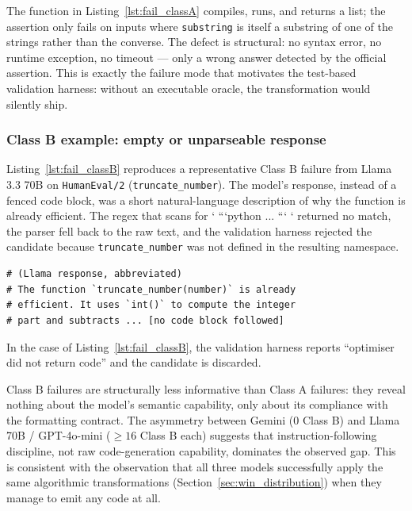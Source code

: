 \documentclass[conference]{IEEEtran}
\begin{document}
The function in Listing~\ref{lst:fail_classA} compiles, runs, and returns a list; the assertion only fails on inputs where \texttt{substring} is itself a substring of one of the strings rather than the converse. The defect is structural: no syntax error, no runtime exception, no timeout --- only a wrong answer detected by the official assertion. This is exactly the failure mode that motivates the test-based validation harness: without an executable oracle, the transformation would silently ship.

\subsubsection*{Class B example: empty or unparseable response}
Listing~\ref{lst:fail_classB} reproduces a representative Class B failure from Llama 3.3 70B on \texttt{HumanEval/2} (\texttt{truncate\_number}). The model's response, instead of a fenced code block, was a short natural-language description of why the function is already efficient. The regex that scans for ` ```python ... ``` ` returned no match, the parser fell back to the raw text, and the validation harness rejected the candidate because \texttt{truncate\_number} was not defined in the resulting namespace.

\par\medskip\noindent
\begin{minipage}{\columnwidth}
\begin{lstlisting}[caption={Class B failure: Llama 70B on HumanEval/2.}, label={lst:fail_classB}]
# (Llama response, abbreviated)
# The function `truncate_number(number)` is already
# efficient. It uses `int()` to compute the integer
# part and subtracts ... [no code block followed]
\end{lstlisting}
\end{minipage}\par\medskip

In the case of Listing~\ref{lst:fail_classB}, the validation harness reports ``optimiser did not return code'' and the candidate is discarded.

Class B failures are structurally less informative than Class A failures: they reveal nothing about the model's semantic capability, only about its compliance with the formatting contract. The asymmetry between Gemini (0 Class B) and Llama 70B / GPT-4o-mini ($\geq 16$ Class B each) suggests that instruction-following discipline, not raw code-generation capability, dominates the observed gap. This is consistent with the observation that all three models successfully apply the same algorithmic transformations (Section~\ref{sec:win_distribution}) when they manage to emit any code at all.
\end{document}
